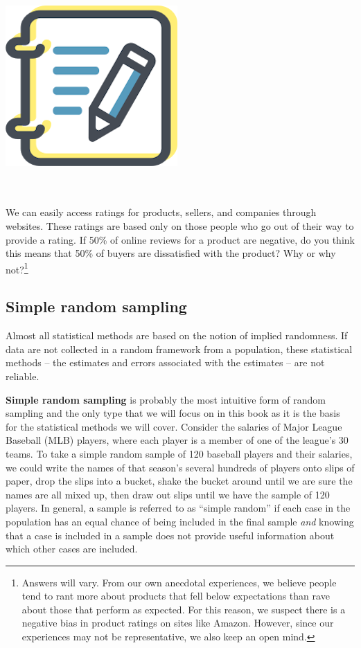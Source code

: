 \documentclass[
  10pt,
  openany]{book}
\newenvironment{mdframedwithfootGPWE}
{   
    \savenotes
    \begin{mdframed}[%
    topline=true, bottomline=true, linecolor=oiB, linewidth=0.5pt,
    rightline=false, leftline=false,
    backgroundcolor=oiLGray]
    \renewcommand{\thempfootnote}{\arabic{footnote}}
    }
{
    \end{mdframed}
    \spewnotes
}
\newenvironment{guidedpractice}{
\vspace{4mm}
\begin{mdframedwithfootGPWE}
\begin{minipage}[t]{0.10\textwidth}
{$\:$ \\ \setkeys{Gin}{width=2.5em,keepaspectratio}\includegraphics{images/_icons/guided-practice.png}}
\end{minipage}
\hfill
\begin{minipage}[t]{0.90\textwidth}
\vspace{-2mm}
\setlength{\parskip}{1em}
\noindent\textbf{\color{oiB}\small\fontfamily{phv}\selectfont{\MakeUppercase{Guided Practice}}} $\:$ \\ \\
}{\end{minipage}
\end{mdframedwithfootGPWE}
\vspace{4mm}
}
\begin{document}
\begin{guidedpractice}
We can easily access ratings for products, sellers, and companies through websites.
These ratings are based only on those people who go out of their way to provide a rating.
If 50\% of online reviews for a product are negative, do you think this means that 50\% of buyers are dissatisfied with the product?
Why or why not?\footnote{Answers will vary.
  From our own anecdotal experiences, we believe people tend to rant more about products that fell below expectations than rave about those that perform as expected.
  For this reason, we suspect there is a negative bias in product ratings on sites like Amazon.
  However, since our experiences may not be representative, we also keep an open mind.}

\end{guidedpractice}

   

\hypertarget{simple-random-sampling}{%
\subsection{Simple random sampling}\label{simple-random-sampling}}

Almost all statistical methods are based on the notion of implied randomness.
If data are not collected in a random framework from a population, these statistical methods -- the estimates and errors associated with the estimates -- are not reliable.


\textbf{Simple random sampling} is probably the most intuitive form of random sampling and the only type that we will focus on in this book as it is the basis for the statistical methods we will cover.
Consider the salaries of Major League Baseball (MLB) players, where each player is a member of one of the league's 30 teams.
To take a simple random sample of 120 baseball players and their salaries, we could write the names of that season's several hundreds of players onto slips of paper, drop the slips into a bucket, shake the bucket around until we are sure the names are all mixed up, then draw out slips until we have the sample of 120 players.
In general, a sample is referred to as ``simple random'' if each case in the population has an equal chance of being included in the final sample \emph{and} knowing that a case is included in a sample does not provide useful information about which other cases are included.
\end{document}
